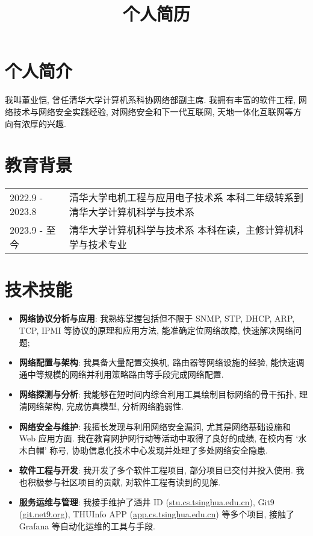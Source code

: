\documentclass[a4paper, 10pt]{article}
\title{个人简历}
\date{}
\begin{document}
\maketitle
\vspace{-2em}

\section*{个人简介}
我叫董业恺, 曾任清华大学计算机系科协网络部副主席. 我拥有丰富的软件工程, 网络技术与网络安全实践经验, 对网络安全和下一代互联网, 天地一体化互联网等方向有浓厚的兴趣.

\section*{教育背景}
\noindent
\begin{tabular}{p{}p{}}
    2022.9 - 2023.8 & 清华大学电机工程与应用电子技术系 \newline
        \fontsize{8pt}{10pt}\selectfont 本科二年级转系到清华大学计算机科学与技术系 \\

    2023.9 - 至今 & 清华大学计算机科学与技术系 \newline
        \fontsize{8pt}{10pt}\selectfont 本科在读，主修计算机科学与技术专业 \\
\end{tabular}

\section*{技术技能}
\begin{itemize}[left=0pt]
    \item \textbf{网络协议分析与应用}: 我熟练掌握包括但不限于 SNMP, STP, DHCP, ARP, TCP, IPMI 等协议的原理和应用方法, 能准确定位网络故障, 快速解决网络问题;
    \item \textbf{网络配置与架构}: 我具备大量配置交换机, 路由器等网络设施的经验, 能快速调通中等规模的网络并利用策略路由等手段完成网络配置.
    \item \textbf{网络探测与分析}: 我能够在短时间内综合利用工具绘制目标网络的骨干拓扑, 理清网络架构, 完成仿真模型, 分析网络脆弱性.
    \item \textbf{网络安全与维护}: 我擅长发现与利用网络安全漏洞, 尤其是网络基础设施和 Web 应用方面. 我在教育网护网行动等活动中取得了良好的成绩, 在校内有 `水木白帽' 称号, 协助信息化技术中心发现并处理了多处网络安全隐患.
    \item \textbf{软件工程与开发}: 我开发了多个软件工程项目, 部分项目已交付并投入使用. 我也积极参与社区项目的贡献, 对软件工程有读到的见解.
    \item \textbf{服务运维与管理}: 我接手维护了酒井 ID (\href{https://stu.cs.tsinghua.edu.cn}{stu.cs.tsinghua.edu.cn}), Git9 (\href{https://git.net9.org}{git.net9.org}), THUInfo APP (\href{https://app.cs.tsinghua.edu.cn}{app.cs.tsinghua.edu.cn}) 等多个项目, 接触了 Grafana 等自动化运维的工具与手段.
\end{itemize}
\end{document}
